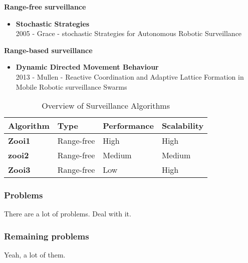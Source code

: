 \textbf{Range-free surveillance}
\begin{itemize}
\item \textbf{Stochastic Strategies}\\
	2005 - Grace - stochastic Strategies for Autonomous Robotic Surveillance
\end{itemize}

\textbf{Range-based surveillance}
\begin{itemize}
\item \textbf{Dynamic Directed Movement Behaviour}\\
	2013 - Mullen - Reactive Coordination and Adaptive Lattice Formation in Mobile Robotic surveillance Swarms
\end{itemize}

  \begin{table}[H]
  \renewcommand{\arraystretch}{1.3}
  \label{table_example}
  \centering
    \begin{tabular}{|l|p{2.2cm}|p{2.2cm}|p{2.2cm}|}
    \hline
    \bfseries Algorithm & \bfseries Type & \bfseries Performance & \bfseries Scalability\\
    \hline
    \bfseries Zooi1 & Range-free & High & High\\\hline
    \bfseries zooi2 & Range-free & Medium & Medium\\\hline
    \bfseries Zooi3 & Range-free & Low  & High\\\hline

    \end{tabular}
  \caption{Overview of Surveillance Algorithms}
  \end{table}


\subsubsection{Problems}
There are a lot of problems. Deal with it. 


\subsubsection{Remaining problems}
Yeah, a lot of them. 












